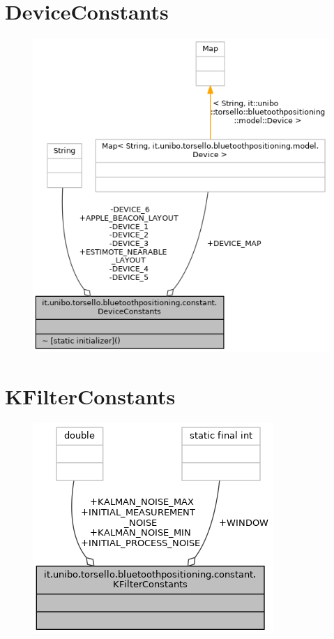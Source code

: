 \section{DeviceConstants}
\begin{figure}[ph]
	\centering
	\includegraphics[width=0.7\linewidth]{img/uml/class/classit_1_1unibo_1_1torsello_1_1bluetoothpositioning_1_1constant_1_1DeviceConstants__coll__graph.png}
	\caption{}
\end{figure}

\newpage
\section{KFilterConstants}
\begin{figure}[ph]
	\centering
	\includegraphics[width=0.5\linewidth]{img/uml/class/classit_1_1unibo_1_1torsello_1_1bluetoothpositioning_1_1constant_1_1KFilterConstants__coll__graph.png}
	\caption{}
\end{figure}


